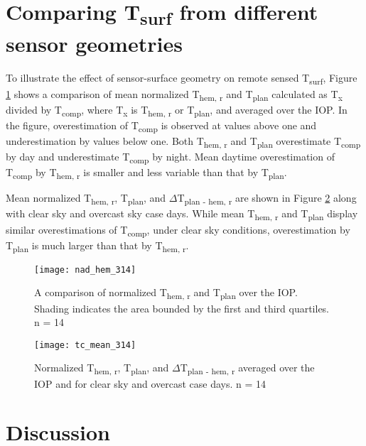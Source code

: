 \begin{bibunit}
\section{Comparing T\textsubscript{surf} from different sensor geometries}

To illustrate the effect of sensor-surface geometry on remote sensed T\textsubscript{surf}, Figure \ref{tc_nadhem} shows a comparison of mean normalized T\textsubscript{hem, r} and T\textsubscript{plan} calculated as T\textsubscript{x} divided by T\textsubscript{comp}, where T\textsubscript{x} is T\textsubscript{hem, r} or T\textsubscript{plan}, and averaged over the IOP. In the figure, overestimation of T\textsubscript{comp} is observed at values above one and underestimation by values below one. Both T\textsubscript{hem, r} and T\textsubscript{plan} overestimate T\textsubscript{comp} by day and underestimate T\textsubscript{comp} by night. Mean daytime overestimation of T\textsubscript{comp} by T\textsubscript{hem, r} is smaller and less variable than that by T\textsubscript{plan}. 

Mean normalized T\textsubscript{hem, r}, T\textsubscript{plan}, and $\Delta$T\textsubscript{plan - hem, r} are shown in Figure \ref{tc_mean2} along with clear sky and overcast sky case days. While mean T\textsubscript{hem, r} and T\textsubscript{plan} display similar overestimations of T\textsubscript{comp}, under clear sky conditions, overestimation by T\textsubscript{plan} is much larger than that by T\textsubscript{hem, r}.

\begin{figure}[H]
	\centering
	\texttt{[image: nad\_hem\_314]}
	\caption{A comparison of normalized T\textsubscript{hem, r} and T\textsubscript{plan} over the IOP. Shading indicates the area bounded by the first and third quartiles. n = 14}
	\label{tc_nadhem}
\end{figure}

\begin{figure}[H]
	\centering
	\texttt{[image: tc\_mean\_314]}
	\caption{Normalized T\textsubscript{hem, r}, T\textsubscript{plan}, and $\Delta$T\textsubscript{plan - hem, r} averaged over the IOP and for clear sky and overcast case days. n = 14}
	\label{tc_mean2}
\end{figure}

\section{Discussion}


\end{bibunit}
